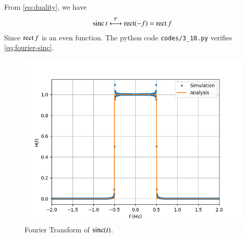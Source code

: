 \documentclass[journal,12pt,twocolumn]{IEEEtran}
\renewcommand\thesection{\arabic{section}}
\begin{document}
\begin{enumerate}[label=\thesection.\arabic*
,ref=\thesection.\theenumi]
\solution From \eqref{eq:duality}, we have 
\begin{align}
    \mathop{\mathrm{sinc}}{t}\overset{\mathcal{F}}{ \longleftrightarrow}\mathop{\mathrm{rect}}(-f)=\mathop{\mathrm{rect}}{f}
    \label{eq:fourier-sinc}
\end{align}
Since $\mathop{\mathrm{rect}}{f}$ is an even function.
The python code \texttt{codes/3\_10.py} verifies \eqref{eq:fourier-sinc}.
\begin{figure}[!ht]
    \includegraphics[width=\columnwidth]{figs/3_10.png}
    \caption{Fourier Transform of $\mathop{\mathrm{sinc}}(t)$.}
    \label{eq:fig-fourier-sinc}
\end{figure}
\end{enumerate}
\end{document}
